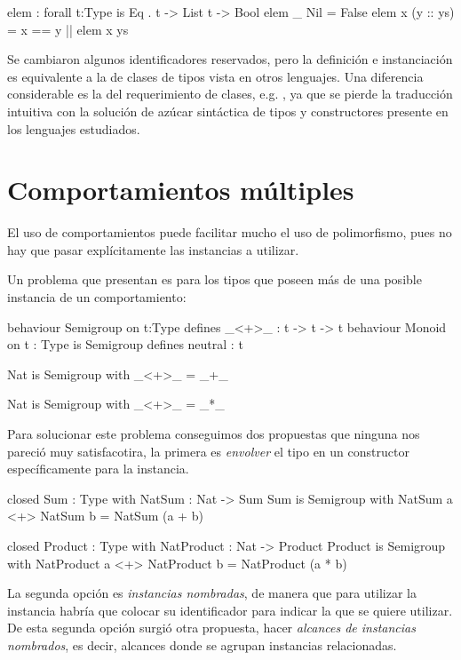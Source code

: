 {\begin{designfr}
\begin{anglercode}
elem : forall t:Type is Eq . t -> List t -> Bool
elem _ Nil = False
elem x (y :: ys) = x == y || elem x ys
\end{anglercode}

Se cambiaron algunos identificadores reservados, pero la definición e instanciación es equivalente a la de clases de tipos vista en otros lenguajes. Una diferencia considerable es la del requerimiento de clases, e.g. , ya que se pierde la traducción intuitiva con la solución de azúcar sintáctica de tipos y constructores presente en los lenguajes estudiados.
\end{designfr}

\section{Comportamientos múltiples}

\begin{designfr}
El uso de comportamientos puede facilitar mucho el uso de polimorfismo, pues no hay que pasar explícitamente las instancias a utilizar.

Un problema que presentan es para los tipos que poseen más de una posible instancia de un comportamiento:

\begin{anglercode}
behaviour Semigroup on t:Type defines
    _<+>_ : t -> t -> t
behaviour Monoid on t : Type is Semigroup defines
    neutral : t

Nat is Semigroup with
    _<+>_ = _+_

Nat is Semigroup with
    _<+>_ = _*_
\end{anglercode}

Para solucionar este problema conseguimos dos propuestas que ninguna nos pareció muy satisfacotira, la primera es \emph{envolver} el tipo en un constructor específicamente para la instancia.

\begin{anglercode}
closed Sum : Type with
    NatSum : Nat -> Sum
Sum is Semigroup with
    NatSum a <+> NatSum b = NatSum (a + b)

closed Product : Type with
    NatProduct : Nat -> Product
Product is Semigroup with
    NatProduct a <+> NatProduct b = NatProduct (a * b)
\end{anglercode}

La segunda opción es \emph{instancias nombradas}, de manera que para utilizar la instancia habría que colocar su identificador para indicar la que se quiere utilizar. De esta segunda opción surgió otra propuesta, hacer \emph{alcances de instancias nombrados}, es decir, alcances donde se agrupan instancias relacionadas.


\end{designfr}}
